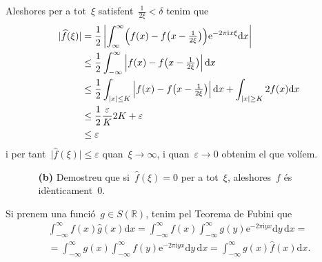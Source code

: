 \documentclass[a4paper]{article}
\theoremstyle{definition}
\newcommand{\iu}{\mathrm{i}}
\newcommand{\e}{\mathrm{e}}
\newcommand{\uppi}{\pi}
\newcommand{\diff}{\mathrm{d}}
\newcommand{\abs}[1]{\lvert{#1}\rvert}
\newcommand{\Abs}[1]{\left\lvert{#1}\right\rvert}
\begin{document}
Aleshores per a tot~\(\xi\) satisfent~\(\frac{1}{2\xi}<\delta\) tenim que
\begin{align*}
    \abs{\widehat{f}(\xi)} &= \frac{1}{2} \Abs{\int_{\infty}^{\infty}
                              \Bigl(
                                  f(x) - f\bigl(
                                      x - {\textstyle\frac{1}{2\xi}}
                                  \bigr)
                              \Bigr)
                              \e^{-2\uppi\iu x\xi}
                              \diff x} \\
                           &\leq \frac{1}{2} \int_{-\infty}^{\infty}
                              \Abs{f(x) - f\bigl(
                                      x - {\textstyle\frac{1}{2\xi}}
                              \bigr)}
                              \diff x \\
                           &\leq \frac{1}{2} \int_{\abs{x}\leq K}
                              \Abs{f(x) - f\bigl(
                                      x - {\textstyle\frac{1}{2\xi}}
                              \bigr)}
                              \diff x
                              +
                              \int_{\abs{x}\geq K}
                              2f(x)
                              \diff x \\
                           &\leq \frac{1}{2}
                              \frac{\varepsilon}{K}2K
                              +\varepsilon \\
                           &\leq \varepsilon
\end{align*}
i per tant~\(\abs{\widehat{f}(\xi)} \leq \varepsilon\) quan~\(\xi\to\infty\), i
quan~\(\varepsilon\to0\) obtenim el que volíem.

\begin{enumerate}
    \item[]\begin{enumerate}
        \item[\textbf{(b)}] Demostreu que si~\(\widehat{f}(\xi) = 0\) per a
            tot~\(\xi\), aleshores~\(f\) és idènticament~\(0\).
    \end{enumerate}
\end{enumerate}

Si prenem una funció~\(g\in S(\mathbb{R})\), tenim pel Teorema de Fubini que
\begin{multline*}
    \int_{-\infty}^{\infty} f(x)\widehat{g}(x) \diff x
    = \int_{-\infty}^{\infty} f(x)
    \int_{-\infty}^{\infty} g(y) \e^{-2\uppi\iu yx} \diff y\, \diff x = \\
    = \int_{-\infty}^{\infty} g(x)
    \int_{-\infty}^{\infty} f(y) \e^{-2\uppi\iu yx} \diff y\, \diff x
    = \int_{-\infty}^{\infty} g(x)\widehat{f}(x) \diff x.
\end{multline*}
\end{document}
